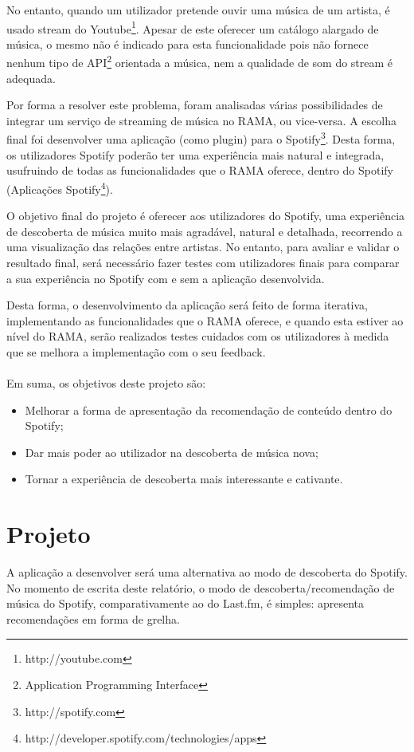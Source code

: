 No entanto, quando um utilizador pretende ouvir uma música de um artista, é usado stream do Youtube\footnote{http://youtube.com}. 
Apesar de este oferecer um catálogo alargado de música, o mesmo não é indicado para esta funcionalidade pois não fornece nenhum tipo de API\footnote{Application Programming Interface} orientada a música, nem a qualidade de som do stream é adequada.

Por forma a resolver este problema, foram analisadas várias possibilidades de integrar um serviço de streaming de música no RAMA, ou vice-versa.
A escolha final foi desenvolver uma aplicação (como plugin) para o Spotify\footnote{http://spotify.com}.
Desta forma, os utilizadores Spotify poderão ter uma experiência mais natural e integrada, usufruindo de todas as funcionalidades que o RAMA oferece, dentro do Spotify (Aplicações Spotify\footnote{http://developer.spotify.com/technologies/apps}).
 

O objetivo final do projeto é oferecer aos utilizadores do Spotify, uma experiência de descoberta de música muito mais agradável, natural e detalhada, recorrendo a uma visualização das relações entre artistas.
No entanto, para avaliar e validar o resultado final, será necessário fazer testes com utilizadores finais para comparar a sua experiência no Spotify com e sem a aplicação desenvolvida.

Desta forma, o desenvolvimento da aplicação será feito de forma iterativa, implementando as funcionalidades que o RAMA oferece, e quando esta estiver ao nível do RAMA, serão realizados testes cuidados com os utilizadores à medida que se melhora a implementação com o seu feedback.
 \\
 \\
Em suma, os objetivos deste projeto são:

\begin{itemize}
  \item Melhorar a forma de apresentação da recomendação de conteúdo dentro do Spotify;
  \item Dar mais poder ao utilizador na descoberta de música nova;
  \item Tornar a experiência de descoberta mais interessante e cativante.
\end{itemize}

\section{Projeto} \label{sec:proj}

A aplicação a desenvolver será uma alternativa ao modo de descoberta do Spotify.
No momento de escrita deste relatório, o modo de descoberta/recomendação de música do Spotify, comparativamente ao do Last.fm, é simples: apresenta recomendações em forma de grelha.

